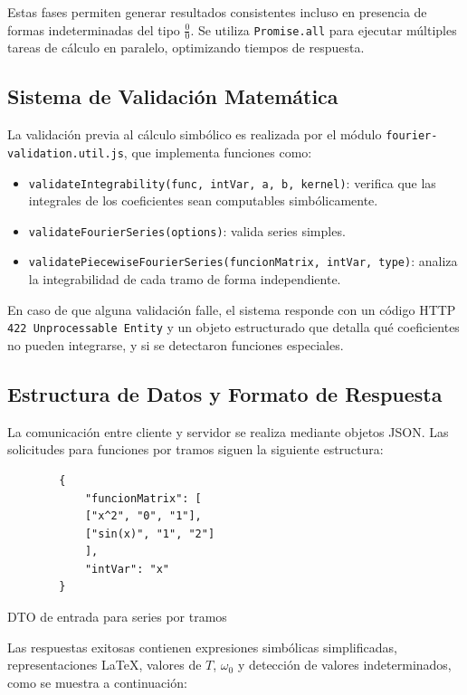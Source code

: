 Estas fases permiten generar resultados consistentes incluso en presencia de formas indeterminadas del tipo $\frac{0}{0}$. Se utiliza \texttt{Promise.all} para ejecutar múltiples tareas de cálculo en paralelo, optimizando tiempos de respuesta.

\subsection{Sistema de Validación Matemática}

La validación previa al cálculo simbólico es realizada por el módulo \texttt{fourier-validation.util.js}, que implementa funciones como:

\begin{itemize}
	\item \texttt{validateIntegrability(func, intVar, a, b, kernel)}: verifica que las integrales de los coeficientes sean computables simbólicamente.
	\item \texttt{validateFourierSeries(options)}: valida series simples.
	\item \texttt{validatePiecewiseFourierSeries(funcionMatrix, intVar, type)}: analiza la integrabilidad de cada tramo de forma independiente.
\end{itemize}

En caso de que alguna validación falle, el sistema responde con un código HTTP \texttt{422 Unprocessable Entity} y un objeto estructurado que detalla qué coeficientes no pueden integrarse, y si se detectaron funciones especiales.

\subsection{Estructura de Datos y Formato de Respuesta}

La comunicación entre cliente y servidor se realiza mediante objetos JSON. Las solicitudes para funciones por tramos siguen la siguiente estructura:


\begin{listing}[H] %
\begin{verbatim}
		{
			"funcionMatrix": [
			["x^2", "0", "1"],
			["sin(x)", "1", "2"]
			],
			"intVar": "x"
		}
	\end{verbatim}
	\caption{DTO de entrada para series por tramos}
	\label{lst:piecewise-request}
\end{listing}

Las respuestas exitosas contienen expresiones simbólicas simplificadas, representaciones LaTeX, valores de $T$, $\omega_0$ y detección de valores indeterminados, como se muestra a continuación:

